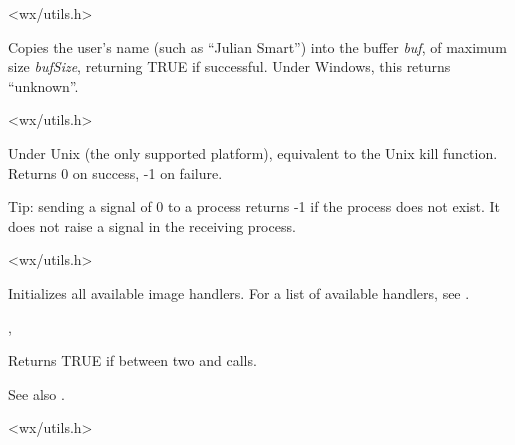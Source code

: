 
<wx/utils.h>



Copies the user's name (such as ``Julian Smart'') into the buffer {\it
buf}, of maximum size {\it bufSize}, returning TRUE if successful.
Under Windows, this returns ``unknown''.


<wx/utils.h>

\label{wxkill}


Under Unix (the only supported platform), equivalent to the Unix kill function.
Returns 0 on success, -1 on failure.

Tip: sending a signal of 0 to a process returns -1 if the process does not exist.
It does not raise a signal in the receiving process.


<wx/utils.h>

\label{wxinitallimagehandlers}


Initializes all available image handlers. For a list of available handlers,
see .


, 

\label{wxisbusy}


Returns TRUE if between two  and\rtfsp
{} calls.

See also .


<wx/utils.h>

\label{wxloaduserresource}


